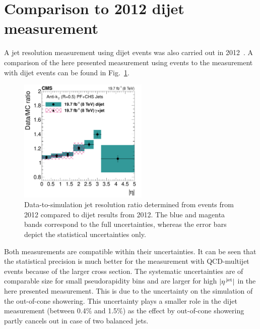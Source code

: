 \section{Comparison to 2012 dijet measurement}
\label{res:sec:comparison_2012}
A jet \pt resolution measurement using dijet events was also carried out in 2012~\cite{bib:CMS:JME_PAS,bib:Kristin_Thesis}.
A comparison of the here presented measurement using \GAMJET events to the measurement with dijet events can be found in Fig.~\ref{res:fig:Comparison_2012}.
\begin{figure}[!t]
 \centering
    \includegraphics[width=0.55\textwidth]{figures/resolution/results/JER_2012_compPhoton_final_v2.pdf}
  \caption{Data-to-simulation jet \pt resolution ratio determined from \GAMJET events from 2012 compared to dijet results from 2012.
           The blue and magenta bands correspond to the full uncertainties, whereas the error bars depict the statistical uncertainties only.}
  \label{res:fig:Comparison_2012}
\end{figure}
Both measurements are compatible within their uncertainties.
It can be seen that the statistical precision is much better for the measurement with QCD-multijet events because of the larger cross section.
The systematic uncertainties are of comparable size for small pseudorapidity bins and are larger for high $|{\eta}^{\text{\,jet}}|$ in the here presented measurement.
This is due to the uncertainty on the simulation of the out-of-cone showering.
This uncertainty plays a smaller role in the dijet measurement (between 0.4\% and 1.5\%) as the effect by out-of-cone showering partly cancels out in case of two balanced jets.
\FloatBarrier
